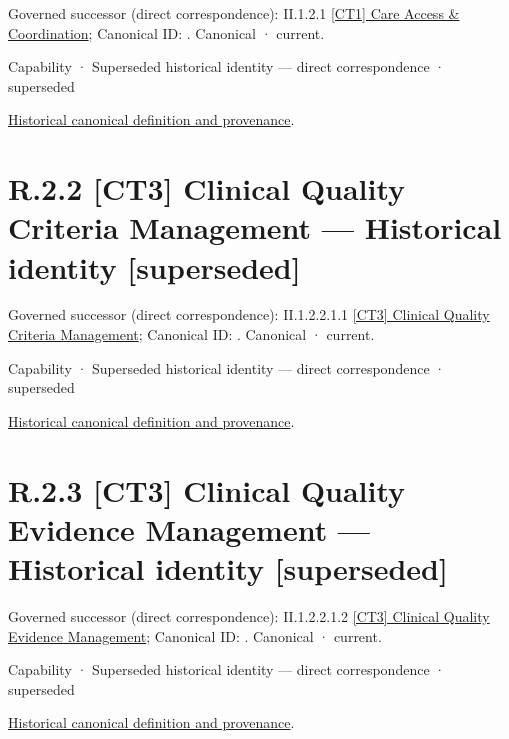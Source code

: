 {\small Governed successor (direct correspondence): II.1.2.1 \hyperref[element:ed342cb8656b4f80b55ad519ecbd2d3a]{[CT1] Care Access \& Coordination}; Canonical ID: \texttt{}. Canonical · current.}\par
\label{element:0dec07b6ddbe48bda93a2295dd3e2d7d}
{\small Capability · Superseded historical identity — direct correspondence · superseded}\par
\href{../../../../continuum/strategy/capability/0dec07b6ddbe48bda93a2295dd3e2d7d.md}{Historical canonical definition and provenance}.\par
\section*{R.2.2 [CT3] Clinical Quality Criteria Management — Historical identity [superseded]}
\label{navigation:R.2.2}

{\small Governed successor (direct correspondence): II.1.2.2.1.1 \hyperref[element:1f48527a9a7c4382a7f8a660ccb9f29f]{[CT3] Clinical Quality Criteria Management}; Canonical ID: \texttt{}. Canonical · current.}\par
\label{element:7a51321b00464016920976b269981edd}
{\small Capability · Superseded historical identity — direct correspondence · superseded}\par
\href{../../../../continuum/strategy/capability/7a51321b00464016920976b269981edd.md}{Historical canonical definition and provenance}.\par
\section*{R.2.3 [CT3] Clinical Quality Evidence Management — Historical identity [superseded]}
\label{navigation:R.2.3}

{\small Governed successor (direct correspondence): II.1.2.2.1.2 \hyperref[element:1b0a1c6945ed4fadba045ff4753c104c]{[CT3] Clinical Quality Evidence Management}; Canonical ID: \texttt{}. Canonical · current.}\par
\label{element:f31902d474894670aeef3e0abbedccf0}
{\small Capability · Superseded historical identity — direct correspondence · superseded}\par
\href{../../../../continuum/strategy/capability/f31902d474894670aeef3e0abbedccf0.md}{Historical canonical definition and provenance}.\par
